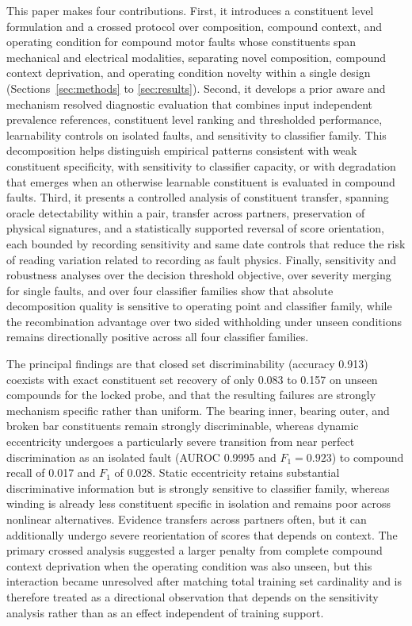 \documentclass{ieeeaccess}
\begin{document}
This paper makes four contributions. First, it introduces a constituent level
formulation and a crossed protocol over composition, compound context, and
operating condition for compound motor faults whose constituents span
mechanical and electrical modalities, separating novel composition, compound
context deprivation, and operating condition novelty within a single design
(Sections~\ref{sec:methods} to \ref{sec:results}). Second, it develops a
prior aware and mechanism resolved diagnostic evaluation that combines input
independent prevalence references, constituent level ranking and thresholded
performance, learnability controls on isolated faults, and sensitivity to
classifier family. This decomposition helps distinguish empirical patterns
consistent with weak constituent specificity, with sensitivity to classifier
capacity, or with degradation that emerges when an otherwise learnable
constituent is evaluated in compound faults. Third, it presents a controlled
analysis of constituent transfer, spanning oracle detectability within a
pair, transfer across partners, preservation of physical signatures, and a
statistically supported reversal of score orientation, each bounded by
recording sensitivity and same date controls that reduce the risk of reading
variation related to recording as fault physics. Finally, sensitivity and
robustness analyses over the decision threshold objective, over severity
merging for single faults, and over four classifier families show that
absolute decomposition quality is sensitive to operating point and classifier
family, while the recombination advantage over two sided withholding under
unseen conditions remains directionally positive across all four classifier
families.

The principal findings are that closed set discriminability (accuracy 0.913)
coexists with exact constituent set recovery of only 0.083 to 0.157 on unseen
compounds for the locked probe, and that the resulting failures are strongly
mechanism specific rather than uniform. The bearing inner, bearing outer, and
broken bar constituents remain strongly discriminable, whereas dynamic
eccentricity undergoes a particularly severe transition from near perfect
discrimination as an isolated fault (AUROC 0.9995 and $F_1=0.923$) to
compound recall of 0.017 and $F_1$ of 0.028. Static eccentricity retains
substantial discriminative information but is strongly sensitive to
classifier family, whereas winding is already less constituent specific in
isolation and remains poor across nonlinear alternatives. Evidence transfers
across partners often, but it can additionally undergo severe reorientation
of scores that depends on context. The primary crossed analysis suggested a
larger penalty from complete compound context deprivation when the operating
condition was also unseen, but this interaction became unresolved after
matching total training set cardinality and is therefore treated as a
directional observation that depends on the sensitivity analysis rather than
as an effect independent of training support.
\end{document}
